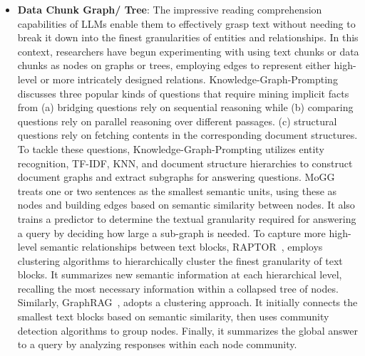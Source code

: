 \begin{itemize}
    \item \textbf{Data Chunk Graph/ Tree}: The impressive reading comprehension capabilities of LLMs enable them to effectively grasp text without needing to break it down into the finest granularities of entities and relationships. In this context, researchers have begun experimenting with using text chunks or data chunks as nodes on graphs or trees, employing edges to represent either high-level or more intricately designed relations. Knowledge-Graph-Prompting~\cite{23_kg_prompting} discusses three popular kinds of questions that require mining implicit facts from (a) bridging questions rely on sequential reasoning while (b) comparing questions rely on parallel reasoning over different passages. (c) structural questions rely on fetching contents in the corresponding document structures. To tackle these questions, Knowledge-Graph-Prompting utilizes entity recognition, TF-IDF, KNN, and document structure hierarchies to construct document graphs and extract subgraphs for answering questions. MoGG~\cite{zhong2024mix} treats one or two sentences as the smallest semantic units, using these as nodes and building edges based on semantic similarity between nodes. It also trains a predictor to determine the textual granularity required for answering a query by deciding how large a sub-graph is needed. To capture more high-level semantic relationships between text blocks, RAPTOR~\cite{sarthi2024raptor}, employs clustering algorithms to hierarchically cluster the finest granularity of text blocks. It summarizes new semantic information at each hierarchical level, recalling the most necessary information within a collapsed tree of nodes. Similarly, GraphRAG~\cite{24_graph_rag}, adopts a clustering approach. It initially connects the smallest text blocks based on semantic similarity, then uses community detection algorithms to group nodes. Finally, it summarizes the global answer to a query by analyzing responses within each node community.
\end{itemize}

